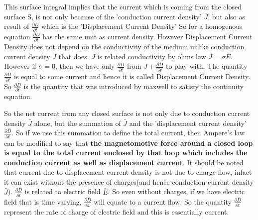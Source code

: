 This surface integral implies that the current which is coming from the closed surface S, is not only because of the 'conduction current density' $\bar{J}$, but also as  result of $\frac{\partial\bar{D}}{\partial t}$ which is the 'Displacement Current Density' So for a homogenous equation $\frac{\partial\bar{D}}{\partial t}$ has the same unit as current density. However Displacement Current Density does not depend on the conductivity of the medium unlike conduction current density $\bar{J}$ that does. $\bar{J}$ is related conductivity by ohms law $\bar{J}=\sigma\bar{E}$. However if $\sigma=0$, then we have only $\frac{\partial\bar{D}}{\partial t}$ from $\bar{J}+\frac{\partial\bar{D}}{\partial t}$ to play with. The quantity $\frac{\partial\bar{D}}{\partial t}$ is equal to some current and hence it is called Displacement Current Density. So $\frac{\partial\bar{D}}{\partial t}$ is the quantity that was introduced by maxwell to satisfy the continuity equation.

So the net current from any closed surface is not only due to conduction current density $\bar{J}$ alone, but the summation of $\bar{J}$ and the 'displacement current density' $\frac{\partial\bar{D}}{\partial t}$. So if we use this summation to define the total current, then Ampere's law can be modified to say that \textbf{the magnetomotive force around a closed loop is equal to the total current enclosed by that loop which includes the conduction current as well as displacement current}. It should be noted that current due to displacement current density is not due to charge flow, infact it can exist without the presence of charges(and hence conduction current density $\bar{J}$). $\frac{\partial\bar{D}}{\partial t}$ is related to electric field $\bar{E}$. So even without charges, if we have electric field that is time varying, $\frac{\partial\bar{D}}{\partial t}$ will equate to a current flow. So the quantity $\frac{\partial\bar{D}}{\partial t}$ represent the rate of charge of electric field and this is essentially current.

